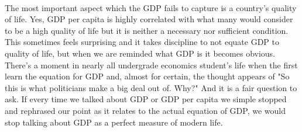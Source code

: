 \\
The most important aspect which the GDP fails to capture is a country's quality of life. Yes, GDP per capita is highly correlated with what many would consider to be a high quality of life but it is neither a necessary nor sufficient condition. This sometimes feels surprising and it takes discipline to not equate GDP to quality of life, but when we are reminded what GDP is it becomes obvious. There's a moment in nearly all undergrade economics student's life when the first learn the equation for GDP and, almost for certain, the thought appears of "So this is what politicians make a big deal out of. Why?" And it is a fair question to ask. If every time we talked about GDP or GDP per capita we simple stopped and rephrased our point as it relates to the actual equation of GDP, we would stop talking about GDP as a perfect measure of modern life. 


